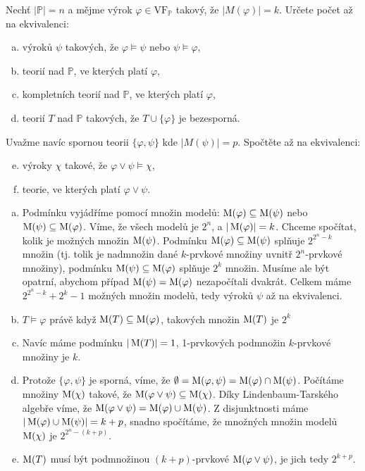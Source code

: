 \begin{problem}

    Nechť $|\mathbb{P}|=n$ a mějme výrok $\varphi\in\mathrm{VF}_{\mathbb{P}}$ takový, že $|M(\varphi)|=k$. Určete počet až na ekvivalenci:
    \begin{enumerate}[(a)]
        \item výroků $\psi$ takových, že $\varphi \models \psi$ nebo $\psi \models \varphi$,
        \item teorií nad $\mathbb{P}$, ve kterých platí $\varphi$,
        \item kompletních teorií nad $\mathbb{P}$, ve kterých platí $\varphi$,
        \item teorií $T$ nad $\mathbb{P}$ takových, že $T \cup \{\varphi\}$ je bezesporná.
    \end{enumerate}
    Uvažme navíc spornou teorii $\{\varphi,\psi\}$ kde $|M(\psi)|=p$. Spočtěte až na ekvivalenci:
    \begin{enumerate}[(a)]\setcounter{enumi}{4}
        \item výroky $\chi$ takové, že $\varphi \vee \psi \models \chi$, 
        \item teorie, ve kterých platí $\varphi \vee \psi$.
    \end{enumerate}

    \begin{solution}
        \begin{enumerate}[(a)]
            \item Podmínku vyjádříme pomocí množin modelů: $\operatorname{M}(\varphi)\subseteq\operatorname{M}(\psi)$ nebo $\operatorname{M}(\psi)\subseteq\operatorname{M}(\varphi)$. Víme, že všech modelů je $2^n$, a $|\operatorname{M}(\varphi)|=k$. Chceme spočítat, kolik je možných množin $\operatorname{M}(\psi)$. Podmínku $\operatorname{M}(\varphi)\subseteq\operatorname{M}(\psi)$ splňuje $2^{2^n-k}$ množin (tj. tolik je nadmnožin dané $k$-prvkové množiny uvnitř $2^n$-prvkové množiny), podmínku $\operatorname{M}(\psi)\subseteq\operatorname{M}(\varphi)$ splňuje $2^k$ množin. Musíme ale být opatrní, abychom případ $\operatorname{M}(\psi)=\operatorname{M}(\varphi)$ nezapočítali dvakrát. Celkem máme $2^{2^n-k}+2^k-1$ možných množin modelů, tedy výroků $\psi$ až na ekvivalenci.
            \item $T\models\varphi$ právě když $\operatorname{M}(T)\subseteq\operatorname{M}(\varphi)$, takových množin $\operatorname{M}(T)$ je $2^k$
            \item Navíc máme podmínku $|\operatorname{M}(T)|=1$, 1-prvkových podmnožin $k$-prvkové množiny je $k$.
            \item Protože $\{\varphi,\psi\}$ je sporná, víme, že $\emptyset=\operatorname{M}(\varphi,\psi)=\operatorname{M}(\varphi)\cap\operatorname{M}(\psi)$. Počítáme množiny $\operatorname{M}(\chi)$ takové, že $\operatorname{M}(\varphi\lor\psi)\subseteq\operatorname{M}(\chi)$. Díky Lindenbaum-Tarského algebře víme, že $\operatorname{M}(\varphi\lor\psi)=\operatorname{M}(\varphi)\cup\operatorname{M}(\psi)$. Z disjunktnosti máme $|\operatorname{M}(\varphi)\cup\operatorname{M}(\psi)|=k+p$, snadno spočítáme, že množných množin modelů $\operatorname{M}(\chi)$ je $2^{2^n-(k+p)}$.
            \item $\operatorname{M}(T)$ musí být podmnožinou $(k+p)$-prvkové $\operatorname{M}(\varphi\lor\psi)$, je jich tedy $2^{k+p}$.
        \end{enumerate}
                
    \end{solution}
    
\end{problem}


